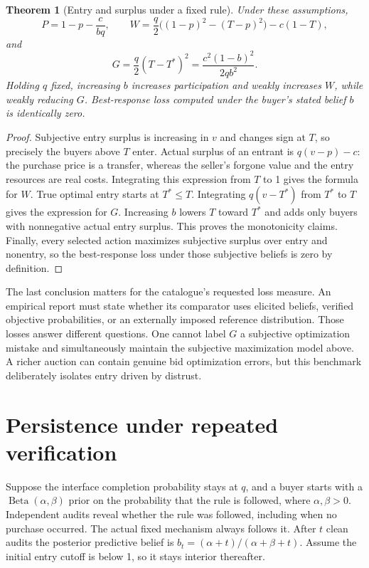 \documentclass[11pt,a4paper]{article}
\newtheorem{theorem}{Theorem}[section]
\theoremstyle{definition}
\theoremstyle{remark}
\begin{document}
\begin{theorem}[Entry and surplus under a fixed rule]
Under these assumptions,
\[
 P=1-p-\frac{c}{bq},\qquad
 W=\frac q2\big((1-p)^2-(T-p)^2\big)-c(1-T),
\]
and
\[
 G=\frac q2(T-T^*)^2=\frac{c^2(1-b)^2}{2qb^2}.
\]
Holding $q$ fixed, increasing $b$ increases participation and weakly increases $W$, while weakly reducing $G$. Best-response loss computed under the buyer's stated belief $b$ is identically zero.
\end{theorem}
\begin{proof}
Subjective entry surplus is increasing in $v$ and changes sign at $T$, so precisely the buyers above $T$ enter. Actual surplus of an entrant is $q(v-p)-c$: the purchase price is a transfer, whereas the seller's forgone value and the entry resources are real costs. Integrating this expression from $T$ to 1 gives the formula for $W$. True optimal entry starts at $T^*\leq T$. Integrating $q(v-T^*)$ from $T^*$ to $T$ gives the expression for $G$. Increasing $b$ lowers $T$ toward $T^*$ and adds only buyers with nonnegative actual entry surplus. This proves the monotonicity claims. Finally, every selected action maximizes subjective surplus over entry and nonentry, so the best-response loss under those subjective beliefs is zero by definition.
\end{proof}

The last conclusion matters for the catalogue's requested loss measure. An empirical report must state whether its comparator uses elicited beliefs, verified objective probabilities, or an externally imposed reference distribution. Those losses answer different questions. One cannot label $G$ a subjective optimization mistake and simultaneously maintain the subjective maximization model above. A richer auction can contain genuine bid optimization errors, but this benchmark deliberately isolates entry driven by distrust.

\section{Persistence under repeated verification}
Suppose the interface completion probability stays at $q$, and a buyer starts with a $\operatorname{Beta}(\alpha,\beta)$ prior on the probability that the rule is followed, where $\alpha,\beta>0$. Independent audits reveal whether the rule was followed, including when no purchase occurred. The actual fixed mechanism always follows it. After $t$ clean audits the posterior predictive belief is $b_t=(\alpha+t)/(\alpha+\beta+t)$. Assume the initial entry cutoff is below 1, so it stays interior thereafter.
\end{document}
